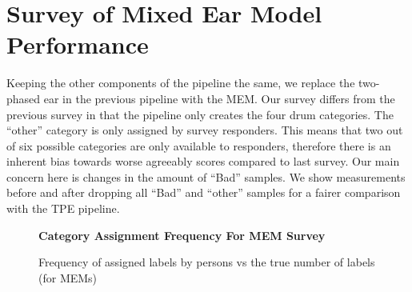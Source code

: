 \documentclass[\main/thesis.tex]{subfiles}
\begin{document}
 \section{Survey of Mixed Ear Model Performance}
 Keeping the other components of the pipeline the same, we replace the two-phased ear in the previous pipeline with the MEM. Our survey differs from the previous survey in that the pipeline only creates the four drum categories. The \enquote{other} category is only assigned by survey responders. This means that two out of six possible categories are only available to responders, therefore there is an inherent bias towards worse agreeably scores compared to last survey. Our main concern here is changes in the amount of \enquote{Bad} samples. We show measurements before and after dropping all \enquote{Bad} and \enquote{other} samples for a fairer comparison with the TPE pipeline.

 \begin{table}[t]
\caption{\label{kappa_table_MEM}Table of Fleiss' kappa coefficient to measure the degree of agreement between persons (HvH) and persons and MEM. We measure the agreeability scores after dropping bad samples if both or either persons assigned the sample as such. We also measure agree-ability when all samples deemed \enquote{Bad} or \enquote{other} by either person are removed.}
\end{table}

\begin{figure}[htpb]
    \begin{center}
    \textbf{Category Assignment Frequency For MEM Survey}
    \end{center}
    \caption{Frequency of assigned labels by persons vs the true number of labels (for MEMs)}
\label{fig:freq-survey-2p}
\end{figure} 
\end{document}
